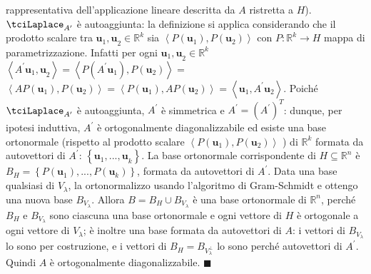 \documentclass{article}
\begin{document}
rappresentativa dell'applicazione lineare descritta da $A$ ristretta a $H$). 
$\tciLaplace _{A^{\prime }}$ \`{e} autoaggiunta: la definizione si applica
considerando che il prodotto scalare tra $\mathbf{u}_{1}\mathbf{,u}_{2}\in 
\mathbb{R}
^{k}$ sia $\left\langle P\left( \mathbf{u}_{1}\right) ,P\left( \mathbf{u}%
_{2}\right) \right\rangle $ con $P:%
\mathbb{R}
^{k}\rightarrow H$ mappa di parametrizzazione. Infatti per ogni $\mathbf{u}%
_{1}\mathbf{,u}_{2}\in 
\mathbb{R}
^{k}$ $\left\langle A^{\prime }\mathbf{u}_{1}\mathbf{,u}_{2}\right\rangle
=\left\langle P\left( A^{\prime }\mathbf{u}_{1}\right) ,P\left( \mathbf{u}%
_{2}\right) \right\rangle =$ $\left\langle AP\left( \mathbf{u}_{1}\right)
,P\left( \mathbf{u}_{2}\right) \right\rangle =\left\langle P\left( \mathbf{u}%
_{1}\right) ,AP\left( \mathbf{u}_{2}\right) \right\rangle =\left\langle 
\mathbf{u}_{1},A^{\prime }\mathbf{u}_{2}\right\rangle $. Poich\'{e} $%
\tciLaplace _{A^{\prime }}$ \`{e} autoaggiunta, $A^{\prime }$ \`{e}
simmetrica e $A^{\prime }=\left( A^{\prime }\right) ^{T}$: dunque, per
ipotesi induttiva, $A^{\prime }$ \`{e} ortogonalmente diagonalizzabile ed
esiste una base ortonormale (rispetto al prodotto scalare $\left\langle
P\left( \mathbf{u}_{1}\right) ,P\left( \mathbf{u}_{2}\right) \right\rangle $%
) di $%
\mathbb{R}
^{k}$ formata da autovettori di $A^{\prime }$: $\left\{ \mathbf{u}_{1}%
\mathbf{,...,u}_{k}\right\} $. La base ortonormale corrispondente di $%
H\subseteq 
\mathbb{R}
^{n}$ \`{e} $B_{H}=\left\{ P\left( \mathbf{u}_{1}\right) \mathbf{,...,}%
P\left( \mathbf{u}_{k}\right) \right\} $, formata da autovettori di $%
A^{\prime }$. Data una base qualsiasi di $V_{\lambda }$, la ortonormalizzo
usando l'algoritmo di Gram-Schmidt e ottengo una nuova base $B_{V_{\lambda
}} $. Allora $B=B_{H}\cup B_{V_{\lambda }}$ \`{e} una base ortonormale di $%
\mathbb{R}
^{n}$, perch\'{e} $B_{H}$ e $B_{V_{\lambda }}$ sono ciascuna una base
ortonormale e ogni vettore di $H$ \`{e} ortogonale a ogni vettore di $%
V_{\lambda }$; \`{e} inoltre una base formata da autovettori di $A$: i
vettori di $B_{V_{\lambda }}$ lo sono per costruzione, e i vettori di $%
B_{H}=B_{V_{\lambda }^{\perp }}$ lo sono perch\'{e} autovettori di $%
A^{\prime }$. Quindi $A$ \`{e} ortogonalmente diagonalizzabile. $%
\blacksquare $
\end{document}
